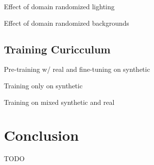 \documentclass{article}
\begin{document}
Effect of domain randomized lighting

Effect of domain randomized backgrounds

\subsection{Training Curicculum}
\label{sec:curicculum}

Pre-training w/ real and fine-tuning on synthetic

Training only on synthetic

Training on mixed synthetic and real

\section{Conclusion}
\label{sec:conclusion}

TODO



\end{document}

